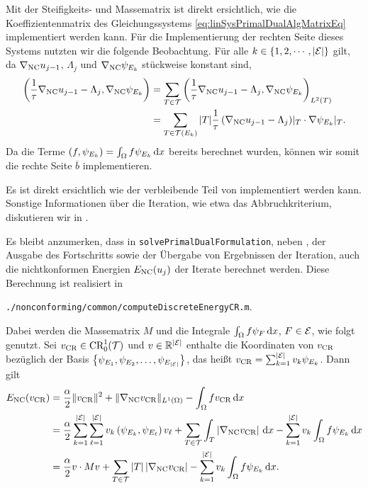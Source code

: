 Mit der Steifigkeits- und Massematrix ist direkt ersichtlich,
wie die Koeffizientenmatrix des Gleichungssystems
\eqref{eq:linSysPrimalDualAlgMatrixEq} implementiert werden kann.
Für die Implementierung der rechten Seite dieses Systems nutzten wir die
folgende Beobachtung.
Für alle $k\in\{1,2,\cdots,|\mathcal{E}|\}$ gilt, da $\nabla_\textup{NC} u_{j-1}$,
$\Lambda_j$ und $\nabla_\textup{NC} \psi_{E_k}$ stückweise konstant sind,
\begin{align*}
  \left(\frac{1}{\tau}\nabla_\textup{NC} u_{j-1}-\Lambda_j,\nabla_\textup{NC}\psi_{E_k}\right)
  &=
  \sum_{T\in\mathcal{T}}
  \left(\frac{1}{\tau}\nabla_\textup{NC} u_{j-1}-\Lambda_j,
  \nabla_\textup{NC}\psi_{E_k}\right)_{L^2(T)}\\
  &=
  \sum_{T\in\mathcal{T}(E_k)} |T|
  \frac{1}{\tau}\left(\nabla_\textup{NC} u_{j-1}-\Lambda_j\right)\!|_T\cdot
  \nabla\psi_{E_k}|_T.
\end{align*}
Da die Terme $\left(f,\psi_{E_k}\right)=\int_\Omega f\psi_{E_k}\,\mathrm{d}x$ bereits
berechnet wurden, können wir somit die rechte Seite $\overline b$
implementieren.

Es ist direkt ersichtlich wie der verbleibende Teil von
 implementiert werden kann.
Sonstige Informationen über die Iteration, wie etwa das Abbruchkriterium,
diskutieren wir in .

Es bleibt anzumerken, dass in \texttt{solvePrimalDualFormulation}, neben 
, der Ausgabe des Fortschritts sowie
der Übergabe von Ergebnissen der Iteration, auch die
nichtkonformen Energien $E_\textup{NC}(u_j)$ der Iterate berechnet werden. 
Diese Berechnung ist realisiert in
\begin{center}
  \texttt{./nonconforming/common/computeDiscreteEnergyCR.m}.
\end{center}
Dabei werden die Massematrix $M$ und die Integrale 
$\int_\Omega f\psi_{F}\,\mathrm{d}x$, $F\in\mathcal{E}$, wie folgt genutzt.
Sei $v_\textup{CR}\in\textup{CR}^1_0(\mathcal{T})$ und $v\in\mathbb{R}^{|\mathcal{E}|}$
enthalte die Koordinaten von $v_\textup{CR}$ bezüglich der Basis
$\left\{\psi_{E_1},\psi_{E_2},\ldots,\psi_{E_{|\mathcal{E}|}}\right\}$, das heißt
$v_\textup{CR}=\sum_{k=1}^{|\mathcal{E}|}v_k \psi_{E_k}$.
Dann gilt
\begin{align*}
  E_\textup{NC}(v_\textup{CR})
  &=
  \frac{\alpha}{2}\Vert v_\textup{CR}\Vert^2
  + \Vert\nabla_\textup{NC} v_\textup{CR}\Vert_{L^1(\Omega)}
  -\int_\Omega fv_\textup{CR}\,\mathrm{d}x\\
  &=
  \frac{\alpha}{2}
  \sum_{k=1}^{|\mathcal{E}|} 
  \sum_{\ell=1}^{|\mathcal{E}|} 
  v_k\left( \psi_{E_k}, \psi_{E_\ell} \right)v_\ell
  + \sum_{T\in\mathcal{T}}
   \int_T\left|\nabla_\textup{NC} v_\textup{CR}\right|\,\mathrm{d}x
  -\sum_{k=1}^{|\mathcal{E}|}v_k\int_\Omega f\psi_{E_k}\,\mathrm{d}x\\
  &=
  \frac{\alpha}{2} v\cdot Mv
  + \sum_{T\in\mathcal{T}}|T| \left|\nabla_\textup{NC} v_\textup{CR}\right|
  -\sum_{k=1}^{|\mathcal{E}|}v_k\int_\Omega f\psi_{E_k}\,\mathrm{d}x.
\end{align*}


